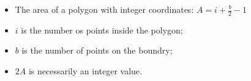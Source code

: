 \begin{itemize}
\item The area of a polygon with integer coordinates:
$A = i + \frac{b}{2} - 1$

\item $i$ is the number os points inside the polygon;

\item $b$ is the number of points on the boundry;

\item $2A$ is necessarily an integer value.

\end{itemize}